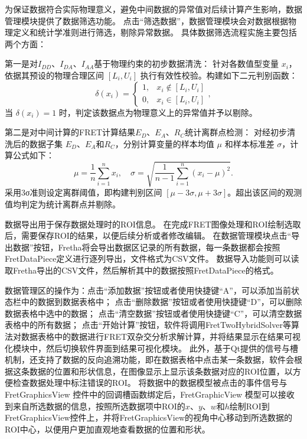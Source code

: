 为保证数据符合实际物理意义，避免中间数据的异常值对后续计算产生影响，数据管理模块提供了数据筛选功能。
点击“筛选数据”，数据管理模块会对数据根据物理定义和统计学准则进行筛选，剔除异常数据。
具体数据筛选流程实施主要包括两个方面：

第一是对$I_{DD}$、$I_{DA}$、$I_{AA}$基于物理约束的初步数据清洗：
针对各数值型变量 \( x_i \)，依据其预设的物理合理区间 \( [L_i, U_i] \) 执行有效性校验。构建如下二元判别函数：
\begin{equation}
  \delta(x_i) = 
  \begin{cases} 
    1, & x_i \notin [L_i, U_i]  \\
    0, & x_i \in [L_i, U_i]
  \end{cases} ,
\end{equation}
当 \( \delta(x_i) = 1 \) 时，判定该数据点为物理意义上的异常值并予以剔除。

第二是对中间计算的FRET计算结果$E_D$、$E_A$、$R_C$统计离群点检测：
对经初步清洗后的数据子集 \( E_D \)、\( E_A \)和$R_C$，分别计算变量的样本均值 \( \mu \) 和样本标准差 \( \sigma \)，计算公式如下：
\begin{equation}
  \mu = \frac{1}{n}\sum_{i=1}^n x_i, \quad \sigma = \sqrt{\frac{1}{n - 1}\sum_{i=1}^n (x_i - \mu)^2}.
\end{equation}
采用3σ准则设定离群阈值，即构建判别区间 \( [\mu - 3\sigma, \mu + 3\sigma] \)。超出该区间的观测值均判定为统计离群点并剔除。


数据导出用于保存数据处理时的ROI信息。
在完成FRET图像处理和ROI绘制选取后，需要保存ROI的结果，以便后续分析或者修改编辑。
在数据管理模块点击“导出数据”按钮，Fretha将会导出数据区记录的所有数据，每一条数据都会按照FretDataPiece定义进行逐列导出，文件格式为CSV文件。
数据导入功能则可以读取Fretha导出的CSV文件，然后解析其中的数据按照FretDataPiece的格式。

数据管理区的操作为：点击“添加数据”按钮或者使用快捷键“A”，可以添加当前状态栏中的数据到数据表格中；
点击“删除数据”按钮或者使用快捷键“D”，可以删除数据表格中选中的数据；
点击“清空数据”按钮或者使用快捷键“C”，可以清空数据表格中的所有数据；
点击“开始计算”按钮，软件将调用FretTwoHybridSolver等算法对数据表格中的数据进行FRET双杂交分析求解计算，并将结果显示在结果可视化模块中，然后切换软件界面到结果可视化模块。
此外，基于Qt提供的信号与槽机制，还支持了数据的反向追溯功能，即在数据表格中点击某一条数据，软件会根据这条数据的位置和形状信息，在图像显示上显示该条数据对应的ROI位置，以方便检查数据处理中标注错误的ROI。
将数据中的数据模型被点击的事件信号与 FretGraphicsView 控件中的回调槽函数绑定后，FretGraphicView 模型可以接收到来自所选数据的信息，按照所选数据项中ROI的$x$、$y$、$w$和$h$绘制ROI到FretGraphicsView控件上，并将FretGraphicsView的视角中心移动到所选数据的ROI中心，以便用户更加直观地查看数据的位置和形状。


